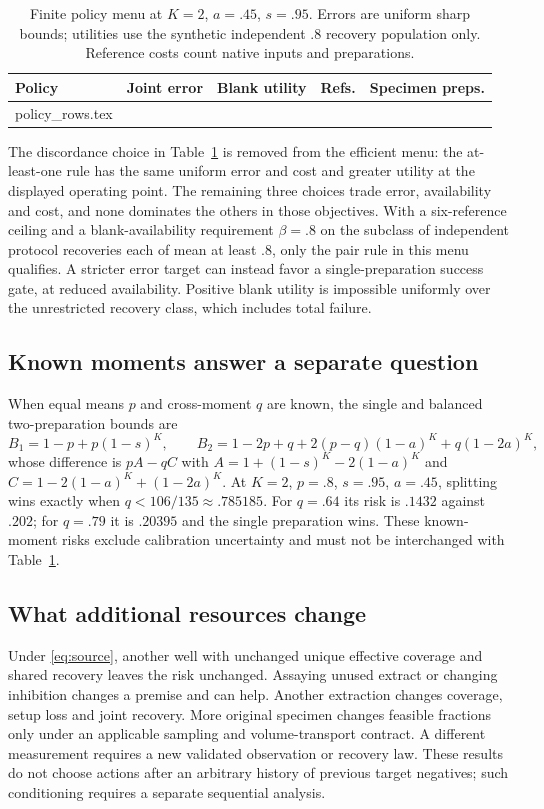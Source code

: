 \documentclass[11pt]{article}
\makeatletter
\let\tableinput\@@input
\theoremstyle{remark}\newtheorem{remark}[theorem]{Remark}
\makeatother
\begin{document}
\begin{table}[tb]
\centering\small
\caption{Finite policy menu at $K=2$, $a=.45$, $s=.95$. Errors are uniform sharp
bounds; utilities use the synthetic independent $.8$ recovery population only.
Reference costs count native inputs and preparations.}
\label{tab:menu}
\begin{tabular}{@{}lrrrr@{}}\toprule
Policy & Joint error & Blank utility & Refs. & Specimen preps.\\\midrule
\tableinput policy_rows.tex
\bottomrule\end{tabular}
\end{table}

The discordance choice in Table~\ref{tab:menu} is removed from the efficient
menu: the at-least-one rule has the same uniform error and cost and greater
utility at the displayed operating point. The remaining three choices trade
error, availability and cost, and none dominates the others in those objectives.
With a six-reference ceiling and a blank-availability requirement $\beta=.8$ on
the subclass of independent protocol recoveries each of mean at least $.8$, only
the pair rule in this menu qualifies. A stricter error target can instead favor a
single-preparation success gate, at reduced availability. Positive blank utility
is impossible uniformly over the unrestricted recovery class, which includes
total failure.

\subsection{Known moments answer a separate question}
When equal means $p$ and cross-moment $q$ are known, the single and balanced
two-preparation bounds are
\[
B_1=1-p+p(1-s)^K,\qquad
B_2=1-2p+q+2(p-q)(1-a)^K+q(1-2a)^K,
\]
whose difference is $pA-qC$ with $A=1+(1-s)^K-2(1-a)^K$ and
$C=1-2(1-a)^K+(1-2a)^K$. At $K=2$, $p=.8$, $s=.95$, $a=.45$, splitting wins
exactly when $q<106/135\approx.785185$. For $q=.64$ its risk is $.1432$ against
$.202$; for $q=.79$ it is $.20395$ and the single preparation wins. These
known-moment risks exclude calibration uncertainty and must not be interchanged
with Table~\ref{tab:menu}.

\subsection{What additional resources change}
Under \eqref{eq:source}, another well with unchanged unique effective coverage
and shared recovery leaves the risk unchanged. Assaying unused extract or
changing inhibition changes a premise and can help. Another extraction changes
coverage, setup loss and joint recovery. More original specimen changes feasible
fractions only under an applicable sampling and volume-transport contract. A
different measurement requires a new validated observation or recovery law.
These results do not choose actions after an arbitrary history of previous target
negatives; such conditioning requires a separate sequential analysis.
\end{document}

